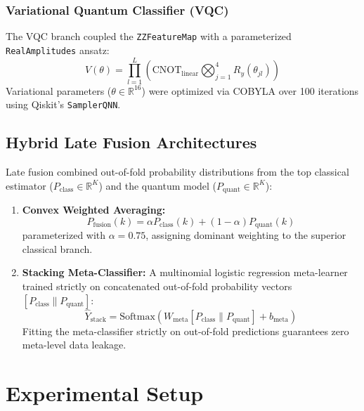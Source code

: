 \documentclass[conference]{IEEEtran}
\begin{document}
\subsubsection{Variational Quantum Classifier (VQC)}
The VQC branch coupled the \texttt{ZZFeatureMap} with a parameterized \texttt{RealAmplitudes} ansatz:
\begin{equation}
V(\theta) = \prod_{l=1}^L \left( \text{CNOT}_{\text{linear}} \bigotimes_{j=1}^4 R_y(\theta_{jl}) \right)
\end{equation}
Variational parameters ($\theta \in \mathbb{R}^{16}$) were optimized via COBYLA over 100 iterations using Qiskit's \texttt{SamplerQNN}.

\subsection{Hybrid Late Fusion Architectures}
Late fusion combined out-of-fold probability distributions from the top classical estimator ($P_{\text{class}} \in \mathbb{R}^K$) and the quantum model ($P_{\text{quant}} \in \mathbb{R}^K$):
\begin{enumerate}
    \item \textbf{Convex Weighted Averaging:}
    \begin{equation}
    P_{\text{fusion}}(k) = \alpha P_{\text{class}}(k) + (1-\alpha) P_{\text{quant}}(k)
    \end{equation}
    parameterized with $\alpha = 0.75$, assigning dominant weighting to the superior classical branch.
    \item \textbf{Stacking Meta-Classifier:} A multinomial logistic regression meta-learner trained strictly on concatenated out-of-fold probability vectors $[P_{\text{class}} \parallel P_{\text{quant}}]$:
    \begin{equation}
    \hat{Y}_{\text{stack}} = \text{Softmax}\left( W_{\text{meta}} [P_{\text{class}} \parallel P_{\text{quant}}] + b_{\text{meta}} \right)
    \end{equation}
    Fitting the meta-classifier strictly on out-of-fold predictions guarantees zero meta-level data leakage.
\end{enumerate}

\section{Experimental Setup}
\end{document}
